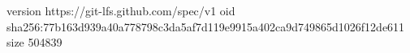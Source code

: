 version https://git-lfs.github.com/spec/v1
oid sha256:77b163d939a40a778798c3da5af7d119e9915a402ca9d749865d1026f12de611
size 504839
